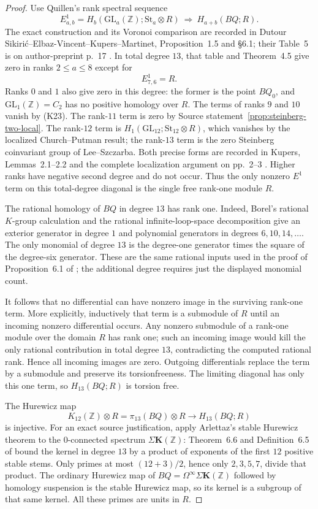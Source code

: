 \begin{proof}
Use Quillen's rank spectral sequence
\[
 E^1_{a,b}=H_b(\mathrm{GL}_a(\mathbb Z);\mathrm{St}_a\otimes R)
 \ \Longrightarrow\ H_{a+b}(BQ;R).
\]
The exact construction and its Voronoi comparison are recorded in
Dutour Sikiri\'c--Elbaz-Vincent--Kupers--Martinet,
Proposition~1.5 and \S6.1; their Table~5 is on author-preprint p.~17
\cite{DEKM2026}. In total degree $13$, that table and
Theorem~4.5 give zero in ranks $2\le a\le8$ except for
\[
 E^1_{7,6}=R.
\]
Ranks $0$ and $1$ also give zero in this degree: the former is the
point $BQ_0$, and $\mathrm{GL}_1(\mathbb Z)=C_2$ has no positive
homology over $R$. The terms of ranks $9$ and $10$ vanish by (K23). The rank-$11$
term is zero by Source statement~\ref{prop:steinberg-two-local}.
The rank-$12$ term is $H_1(\mathrm{GL}_{12};\mathrm{St}_{12}\otimes R)$,
which vanishes by the localized Church--Putman result; the rank-$13$
term is the zero Steinberg coinvariant group of Lee--Szczarba.
Both precise forms are recorded in Kupers, Lemmas~2.1--2.2 and the
complete localization argument on pp.~2--3
\cite{Kupers2019}. Higher ranks have negative second degree and do
not occur. Thus the only nonzero $E^1$ term on this total-degree
diagonal is the single free rank-one module $R$.

The rational homology of $BQ$ in degree $13$ has rank one.
Indeed, Borel's rational $K$-group calculation and the rational
infinite-loop-space decomposition give an exterior generator in
degree $1$ and polynomial generators in degrees $6,10,14,\ldots$.
The only monomial of degree $13$ is the degree-one generator times
the square of the degree-six generator. These are the same rational
inputs used in the proof of Proposition~6.1 of
\cite{DEKM2026}; the additional degree requires just the
displayed monomial count.

It follows that no differential can have nonzero image in the
surviving rank-one term. More explicitly, inductively that term is
a submodule of $R$ until an incoming nonzero differential occurs.
Any nonzero submodule of a rank-one module over the domain $R$ has
rank one; such an incoming image would kill the only rational
contribution in total degree $13$, contradicting the computed
rational rank. Hence all incoming images are zero. Outgoing
differentials replace the term by a submodule and preserve its
torsionfreeness. The limiting diagonal has only this one term, so
$H_{13}(BQ;R)$ is torsion free.

The Hurewicz map
\[
 K_{12}(\mathbb Z)\otimes R
   =\pi_{13}(BQ)\otimes R\longrightarrow H_{13}(BQ;R)
\]
is injective. For an exact source justification, apply Arlettaz's
stable Hurewicz theorem to the $0$-connected spectrum
$\Sigma\mathbf K(\mathbb Z)$: Theorem~6.6 and Definition~6.5 of
\cite[pp.~40--42]{Arlettaz2000} bound the kernel in degree $13$
by a product of exponents of the first $12$ positive stable stems.
Only primes at most $(12+3)/2$, hence only $2,3,5,7$, divide that
product. The ordinary Hurewicz map of
$BQ=\Omega^\infty\Sigma\mathbf K(\mathbb Z)$ followed by homology
suspension is the stable Hurewicz map, so its kernel is a subgroup
of that same kernel. All these primes are units in $R$.


\end{proof}
